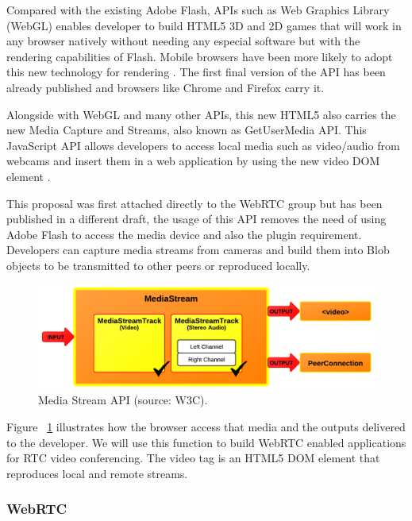 Compared with the existing Adobe Flash, APIs such as Web Graphics Library (WebGL) enables developer to build HTML5 3D and 2D games that will work in any browser natively without needing any especial software but with the rendering capabilities of Flash. Mobile browsers have been more likely to adopt this new technology for rendering \cite{webglDraft}. The first final version of the API has been already published and browsers like Chrome and Firefox carry it.

Alongside with WebGL and many other APIs, this new HTML5 also carries the new Media Capture and Streams, also known as GetUserMedia API. This JavaScript API allows developers to access local media such as video/audio from webcams and insert them in a web application by using the new video DOM element \cite{getusermediaDraft}.

This proposal was first attached directly to the WebRTC group but has been published in a different draft, the usage of this API removes the need of using Adobe Flash to access the media device and also the plugin requirement. Developers can capture media streams from cameras and build them into Blob objects to be transmitted to other peers or reproduced locally.

 \begin{figure}[h]
  \centering
    \includegraphics[scale=1]{./figures/mediastreamAPI.png}
      \caption[Media Stream API (source: W3C)]{Media Stream API (source: W3C).}
	\label{fig:mediastreamAPI}
\end{figure}

Figure ~\ref{fig:mediastreamAPI} illustrates how the browser access that media and the outputs delivered to the developer. We will use this function to build WebRTC enabled applications for RTC video conferencing. The video tag is an HTML5 DOM element that reproduces local and remote streams.

\subsubsection{WebRTC}

